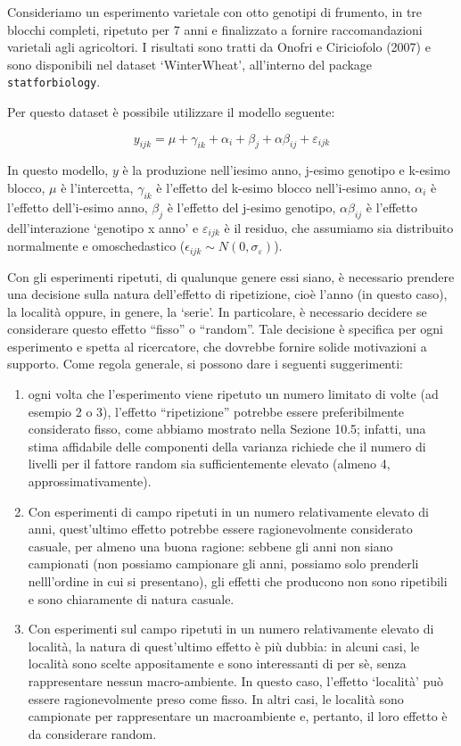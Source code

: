 \documentclass[
  12pt,
]{book}
\providecommand{\tightlist}{%
  \setlength{\itemsep}{0pt}\setlength{\parskip}{0pt}}
\begin{document}
Consideriamo un esperimento varietale con otto genotipi di frumento, in tre blocchi completi, ripetuto per 7 anni e finalizzato a fornire raccomandazioni varietali agli agricoltori. I risultati sono tratti da Onofri e Ciriciofolo (2007) e sono disponibili nel dataset `WinterWheat', all'interno del package \texttt{statforbiology}.

Per questo dataset è possibile utilizzare il modello seguente:

\[y_{ijk} = \mu + \gamma_{ik} + \alpha_i + \beta_j + \alpha\beta_{ij} + \varepsilon_{ijk}\]

In questo modello, \(y\) è la produzione nell'iesimo anno, j-esimo genotipo e k-esimo blocco, \(\mu\) è l'intercetta, \(\gamma_{ik}\) è l'effetto del k-esimo blocco nell'i-esimo anno, \(\alpha_i\) è l'effetto dell'i-esimo anno, \(\beta_j\) è l'effetto del j-esimo genotipo, \(\alpha\beta_{ij}\) è l'effetto dell'interazione `genotipo x anno' e \(\varepsilon_{ijk}\) è il residuo, che assumiamo sia distribuito normalmente e omoschedastico (\(\epsilon_{ijk} \sim N(0, \sigma_{\varepsilon})\)).

Con gli esperimenti ripetuti, di qualunque genere essi siano, è necessario prendere una decisione sulla natura dell'effetto di ripetizione, cioè l'anno (in questo caso), la località oppure, in genere, la `serie'. In particolare, è necessario decidere se considerare questo effetto ``fisso'' o ``random''. Tale decisione è specifica per ogni esperimento e spetta al ricercatore, che dovrebbe fornire solide motivazioni a supporto. Come regola generale, si possono dare i seguenti suggerimenti:

\begin{enumerate}
\def\labelenumi{\arabic{enumi}.}
\tightlist
\item
  ogni volta che l'esperimento viene ripetuto un numero limitato di volte (ad esempio 2 o 3), l'effetto ``ripetizione'' potrebbe essere preferibilmente considerato fisso, come abbiamo mostrato nella Sezione 10.5; infatti, una stima affidabile delle componenti della varianza richiede che il numero di livelli per il fattore random sia sufficientemente elevato (almeno 4, approssimativamente).
\item
  Con esperimenti di campo ripetuti in un numero relativamente elevato di anni, quest'ultimo effetto potrebbe essere ragionevolmente considerato casuale, per almeno una buona ragione: sebbene gli anni non siano campionati (non possiamo campionare gli anni, possiamo solo prenderli nelll'ordine in cui si presentano), gli effetti che producono non sono ripetibili e sono chiaramente di natura casuale.
\item
  Con esperimenti sul campo ripetuti in un numero relativamente elevato di località, la natura di quest'ultimo effetto è più dubbia: in alcuni casi, le località sono scelte appositamente e sono interessanti di per sè, senza rappresentare nessun macro-ambiente. In questo caso, l'effetto `località' può essere ragionevolmente preso come fisso. In altri casi, le località sono campionate per rappresentare un macroambiente e, pertanto, il loro effetto è da considerare random.
\end{enumerate}
\end{document}
